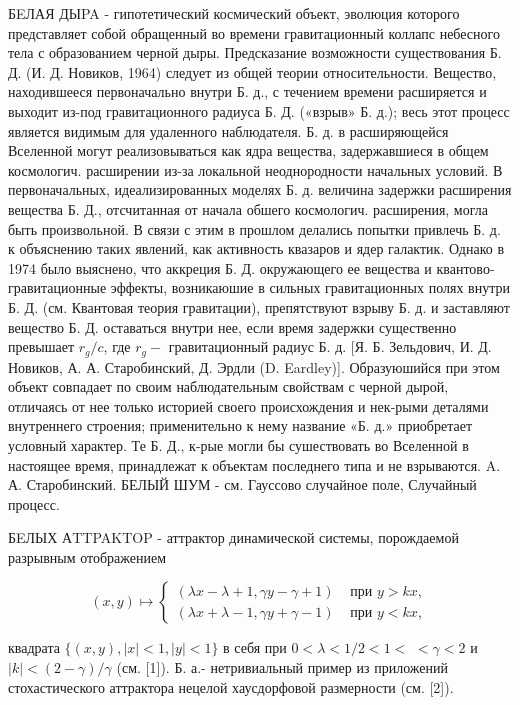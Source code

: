 \documentclass[10pt]{article}
\begin{document}
БEЛАЯ ДЫPA - гипотетический космический объект, эволюция которого представляет собой обращенный во времени гравитационный коллапс небесного тела с образованием черной дыры. Предсказание возможности существования Б. Д. (И. Д. Новиков, 1964) следует из общей теории относительности. Вещество, находившееся первоначально внутри Б. д., с течением времени расширяется и выходит из-под гравитационного радиуса Б. Д. («взрыв» Б. д.); весь этот процесс является видимым для удаленного наблюдателя. Б. д. в расширяющейся Вселенной могут реализовываться как ядра вещества, задержавшиеся в общем космологич. расширении из-за локальной неоднородности начальных условий. В первоначальных, идеализированных моделях Б. д. величина задержки расширения вещества Б. Д., отсчитанная от начала обшего космологич. расширения, могла быть произвольной. В связи с этим в прошлом делались попытки привлечь Б. д. к объяснению таких явлений, как активность квазаров и ядер галактик. Однако в 1974 было выяснено, что аккреция Б. Д. окружающего ее вещества и квантово-гравитационные эффекты, возникаюшие в сильных гравитационных полях внутри Б. Д. (см. Квантовая теория гравитации), препятствуют взрыву Б. д. и заставляют вещество Б. Д. оставаться внутри нее, если время задержки существенно превышает $r_{g} / c$, где $r_{g}-$ гравитационный радиус Б. д. [Я. Б. Зельдович, И. Д. Новиков, А. А. Старобинский, Д. Эрдли (D. Eardley)]. Образуюшийся при этом объект совпадает по своим наблюдательным свойствам с черной дырой, отличаясь от нее только историей своего происхождения и нек-рыми деталями внутреннего строения; применительно к нему название «Б. д.» приобретает условный характер. Те Б. Д., к-рые могли бы сушествовать во Вселенной в настоящее время, принадлежат к объектам последнего типа и не взрываются. A. А. Старобинский. БЕЛЫЙ ШУМ - см. Гауссово случайное поле, Случайный процесс.



БEЛЫХ АTTPAKTOP - аттрактор динамической системы, порождаемой разрывным отображением



\[

(x, y) \mapsto \begin{cases}(\lambda x-\lambda+1, \gamma y-\gamma+1) & \text { при } y>k x, \\ (\lambda x+\lambda-1, \gamma y+\gamma-1) & \text { при } y<k x,\end{cases}

\]



квадрата $\{(x, y),|x|<1,|y|<1\}$ в себя при $0<\lambda<1 / 2<1<$ $<\gamma<2$ и $|k|<(2-\gamma) / \gamma$ (см. [1]). Б. а.- нетривиальный пример из приложений стохастического аттрактора нецелой хаусдорфовой размерности (см. [2]).
\end{document}
